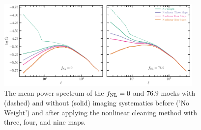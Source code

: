 \begin{figure}
    \centering
    \includegraphics[width=0.9\textwidth]{figures/clmocks.pdf}
    \caption{The mean power spectrum of the $f_{\rm NL} =0$ and $76.9$ mocks with (dashed) and without (solid) imaging systematics before ('No Weight') and after applying the nonlinear cleaning method with three, four, and nine maps. }
\end{figure}

